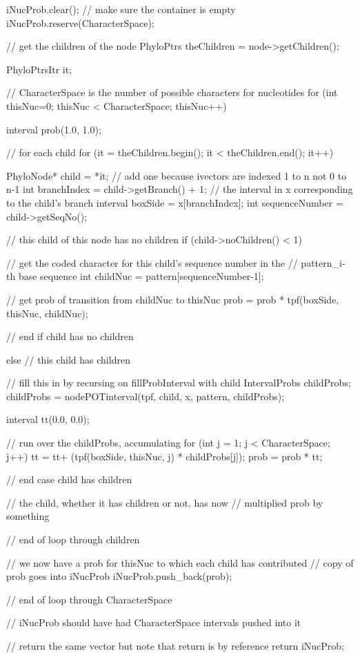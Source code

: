 \begin{DoxyCode}
{
  iNucProb.clear(); // make sure the container is empty
  iNucProb.reserve(CharacterSpace);

                    // get the children of the node
  PhyloPtrs theChildren = node->getChildren();

  PhyloPtrsItr it;

  // CharacterSpace is the number of possible characters for nucleotides
  for (int thisNuc=0; thisNuc < CharacterSpace; thisNuc++)
  {
    interval prob(1.0, 1.0);

    // for each child
    for (it = theChildren.begin(); it < theChildren.end(); it++)
    {

      PhyloNode* child = *it;
                    // add one because ivectors are indexed 1 to n not 0 to n-1
      int branchIndex = child->getBranch() + 1;
                    // the interval in x corresponding to the child's branch
      interval boxSide = x[branchIndex];
      int sequenceNumber = child->getSeqNo();

                    // this child of this node has no children
      if (child->noChildren() < 1)
      {

        // get the coded character for this child's sequence number in the 
        // pattern_i-th base sequence
        int childNuc = pattern[sequenceNumber-1];

        // get prob of transition from childNuc to thisNuc
        prob = prob * tpf(boxSide, thisNuc, childNuc);

      }             // end if child has no children

      else          // this child has children
      {

                    // fill this in by recursing on fillProbInterval with child
        IntervalProbs childProbs;
        childProbs = nodePOTinterval(tpf, child, x, pattern, childProbs);

        interval tt(0.0, 0.0);

        // run over the childProbs, accumulating
        for (int j = 1; j < CharacterSpace; j++)
        {
          tt = tt+ (tpf(boxSide, thisNuc, j) * childProbs[j]);
        }
        prob = prob * tt;
      }             // end case child has children

      // the child, whether it has children or not, has now 
      // multiplied prob by something
    }               // end of loop through children

    // we now have a prob for thisNuc to which each child has contributed
                    // copy of prob goes into iNucProb
    iNucProb.push_back(prob);
  }                 // end of loop through CharacterSpace

  // iNucProb should have had CharacterSpace intervals pushed into it

  // return the same vector but note that return is by reference
  return iNucProb;
}
\end{DoxyCode}
